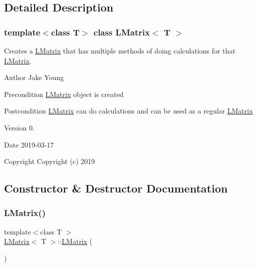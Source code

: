 \subsection{Detailed Description}
\subsubsection*{template$<$class T$>$\newline
class L\+Matrix$<$ T $>$}

Creates a \mbox{\hyperlink{class_l_matrix}{L\+Matrix}} that has multiple methods of doing calculations for that \mbox{\hyperlink{class_l_matrix}{L\+Matrix}}. 

\begin{DoxyAuthor}{Author}
Jake Young 
\end{DoxyAuthor}
\begin{DoxyPrecond}{Precondition}
\mbox{\hyperlink{class_l_matrix}{L\+Matrix}} object is created 
\end{DoxyPrecond}
\begin{DoxyPostcond}{Postcondition}
\mbox{\hyperlink{class_l_matrix}{L\+Matrix}} can do calculations and can be used as a regular \mbox{\hyperlink{class_l_matrix}{L\+Matrix}} 
\end{DoxyPostcond}
\begin{DoxyVersion}{Version}
0. 
\end{DoxyVersion}
\begin{DoxyDate}{Date}
2019-\/03-\/17
\end{DoxyDate}
\begin{DoxyCopyright}{Copyright}
Copyright (c) 2019 
\end{DoxyCopyright}


\subsection{Constructor \& Destructor Documentation}
\mbox{\label{class_l_matrix_ae3c54a6ef307ad2e570db483b9fd9c03}} 
\subsubsection{\texorpdfstring{LMatrix()}{LMatrix()}\hspace{0.1cm}{\footnotesize\ttfamily [1/5]}}
{\footnotesize\ttfamily template$<$class T $>$ \\
\mbox{\hyperlink{class_l_matrix}{L\+Matrix}}$<$ T $>$\+::\mbox{\hyperlink{class_l_matrix}{L\+Matrix}} (\begin{DoxyParamCaption}{ }\end{DoxyParamCaption})}



